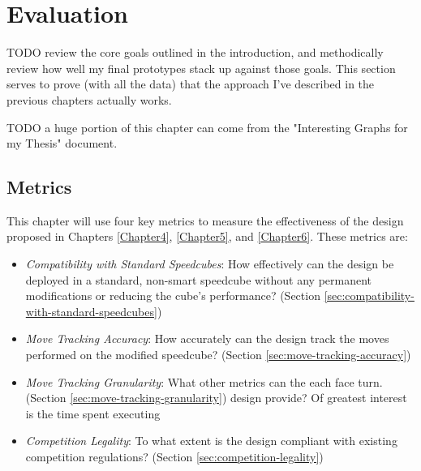 
\chapter{Evaluation} %

\label{Chapter7} %

TODO review the core goals outlined in the introduction, and methodically review how well my final prototypes stack up against those goals. This section serves to prove (with all the data) that the approach I've described in the previous chapters actually works.

TODO a huge portion of this chapter can come from the "Interesting Graphs for my Thesis" document.

\section{Metrics}

This chapter will use four key metrics to measure the
effectiveness of the design proposed in Chapters \ref{Chapter4},
\ref{Chapter5}, and \ref{Chapter6}. These metrics are:

\begin{itemize}

    \item \emph{Compatibility with Standard Speedcubes}: How
    effectively can the design be deployed in a standard, non-smart
    speedcube without any permanent modifications or reducing the
    cube's performance? (Section
    \ref{sec:compatibility-with-standard-speedcubes})
    
    \item \emph{Move Tracking Accuracy}: How accurately can the design
    track the moves performed on the modified speedcube? (Section
    \ref{sec:move-tracking-accuracy})
    
    \item \emph{Move Tracking Granularity}: What other metrics can the
    each face turn. (Section \ref{sec:move-tracking-granularity})
    design provide? Of greatest interest is the time spent executing
    
    \item \emph{Competition Legality}: To what extent is the design
    compliant with existing competition regulations? (Section
    \ref{sec:competition-legality})
    
\end{itemize}


